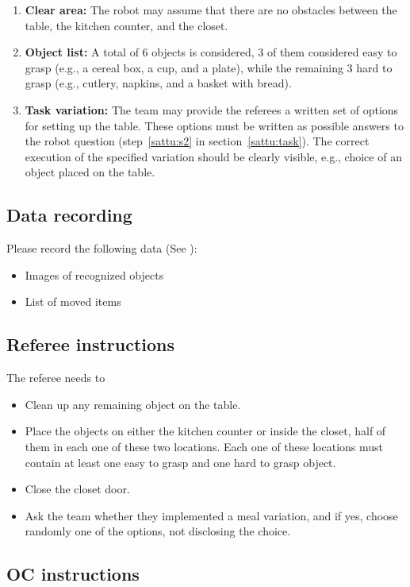 \begin{enumerate}
\item \textbf{Clear area:} The robot may assume that there are no obstacles between the table, the kitchen counter, and the closet.
\item \textbf{Object list:} A total of 6 objects is considered, 3 of them considered easy to grasp (e.g., a cereal box, a cup, and a plate), while the remaining 3 hard to grasp (e.g., cutlery, napkins, and a basket with bread).
\item \textbf{Task variation:} The team may provide the referees a written set of options for setting up the table. These options must be written as possible answers to the robot question (step~\ref{sattu:s2} in section~\ref{sattu:task}). The correct execution of the specified variation should be clearly visible, e.g., choice of an object placed on the table.
\end{enumerate}

\subsection{Data recording}
  Please record the following data (See ):
  \begin{itemize}
   \item Images of recognized objects
   \item List of moved items
  \end{itemize}

\subsection{Referee instructions}

The referee needs to
\begin{itemize}
\item Clean up any remaining object on the table.
\item Place the objects on either the kitchen counter or inside the closet, half of them in each one of these two locations. Each one of these locations must contain at least one easy to grasp and one hard to grasp object.
\item Close the closet door.
\item Ask the team whether they implemented a meal variation, and if yes, choose randomly one of the options, not disclosing the choice.
\end{itemize}

\subsection{OC instructions}

